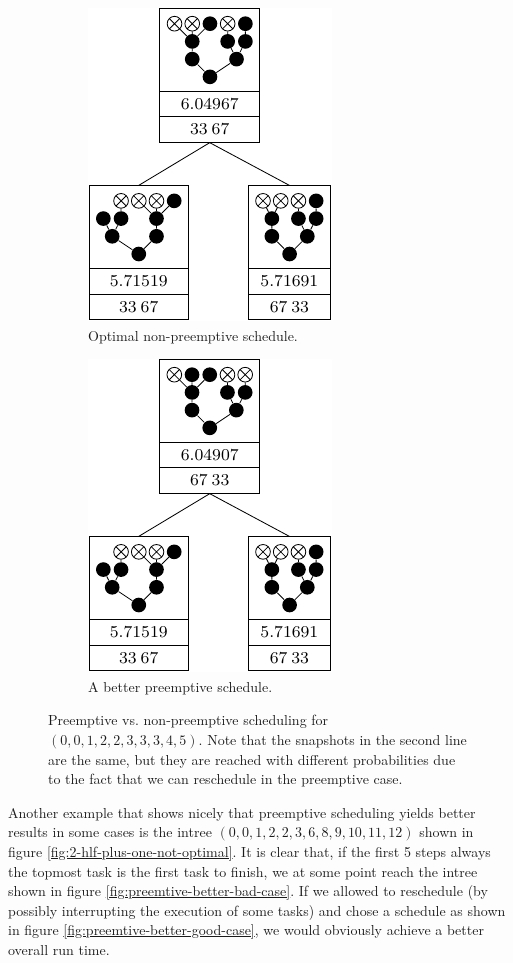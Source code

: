 \begin{figure}[ht]
  \centering
  \begin{subfigure}{.45\linewidth}
    \centering
    \includegraphics{p3/preemtive/0012233345_nonpreemtive.pdf}
    \caption{Optimal non-preemptive schedule.}
  \end{subfigure}
  \quad
  \begin{subfigure}{.45\linewidth}
    \centering
    \includegraphics{p3/preemtive/0012233345_preemtive.pdf}
    \caption{A better preemptive schedule.}
  \end{subfigure}
  \caption{Preemptive vs. non-preemptive scheduling for $(0,0,1,2,2,3,3,3,4,5)$. Note that the snapshots in the second line are the same, but they are reached with different probabilities due to the fact that we can reschedule in the preemptive case.}
  \label{fig:preemtive-example-00111222}
\end{figure}

Another example that shows nicely that preemptive scheduling yields better results in some cases is the intree $(0,0,1,2,2,3,6,8,9,10,11,12)$ shown in figure \ref{fig:2-hlf-plus-one-not-optimal}. It is clear that, if the first 5 steps always the topmost task is the first task to finish, we at some point reach the intree shown in figure \ref{fig:preemtive-better-bad-case}. If we allowed to reschedule (by possibly interrupting the execution of some tasks) and chose a schedule as shown in figure \ref{fig:preemtive-better-good-case}, we would obviously achieve a better overall run time. 

